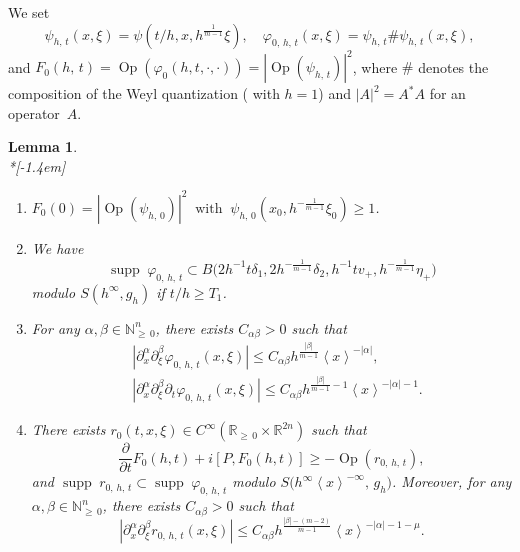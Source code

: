 \documentclass[10pt]{amsart}
\newtheorem{lemm}[cdrthm]{Lemma}
\theoremstyle{definition}
\renewcommand*\a{\alpha}
\renewcommand*\b{\beta}
\renewcommand*\d{\delta}
\newcommand*\f{\varphi}
\newcommand*\g{\psi}
\newcommand*\m{\mu}
\newcommand*\x{\xi}
\newcommand*\y{\eta}
\DeclareMathOperator{\Op}{Op}
\newcommand*\re{\mathbb{R}}
\newcommand{\bbN}{\mathbb{N}}
\newcommand*\pa{\partial}
\DeclareMathOperator{\supp}{supp\;}
\newcommand{\jap}[1]{\left\langle #1 \right\rangle}
\newcommand{\bigpare}[1]{\bigl(#1\bigr)}
\newcommand*{\romanenumi}{\renewcommand*{\theenumi}{\roman{enumi}}}
\begin{document}
We set
\begin{equation}\label{gdef}
\g_{h,\,t}(x,\x)= \g\left(t/h,x,h^{\frac{1}{m-1}}\x\right),\quad \f_{0,\,h,\,t}(x,\x)=\g_{h,\,t}\#\g_{h,\,t}(x,\x),
\end{equation}
and $F_0(h,\,t) =\Op(\f_0(h,t,\cdot, \cdot))=|\Op(\g_{h,\,t})|^2$, where $\#$ denotes the composition of the Weyl quantization (\cite[$(4.3.6)$]{Z} with $h=1$) and $|A|^2=A^*A$ for an operator~$A$.

\begin{lemm}\label{op}\ \\*[-1.4em]
\begin{enumerate}\romanenumi
\item \label{lemmB3.1}$F_0(0) =|\Op(\g_{h,\,0})|^2\;\; \text{with}\;\; \g_{h,\,0}(x_0,h^{-\frac{1}{m-1}}\x_0) \geq 1$.
\item \label{lemmB3.2}We have
\[
\supp \f_{0,\,h,\,t}\subset B\bigpare{2h^{-1}t\d_1,2h^{-\frac{1}{m-1}}\d_2,h^{-1}tv_+,h^{-\frac{1}{m-1}}\y_+}
\]
modulo $S(h^{\infty},g_h)$ if $t/h\geq T_1$.
\item \label{lemmB3.3}For any $\a,\b \in \bbN_{\geq\,0}^n$, there exists $C_{\a\b}>0$ such that
\begin{align*}
&\left|\pa_x^{\a}\pa_{\x}^{\b}\f_{0,\,h,\,t}(x,\x)\right|\leq C_{\a\b} h^{\frac{|\b|}{m-1}} \jap{x}^{-|\a|},\\
&\left|\pa_x^{\a}\pa_{\x}^{\b}\pa_t \f_{0,\,h,\,t}(x,\x)\right|\leq C_{\a\b} h^{\frac{|\b|}{m-1}-1} \jap{x}^{-|\a|-1}.
\end{align*}
\item \label{lemmB3.4}There exists $r_0(t,x,\x) \in C^{\infty} (\re_{\geq\,0} \times \re^{2n})$ such that
\[
\frac{\pa}{\pa t} F_0(h,t) + i[P, F_0(h,t)] \geq -\Op(r_{0,\,h,\,t}),
\]
and $\supp r_{0,\,h,\,t}\subset \supp \f_{0,\,h,\,t}$ modulo $S\bigpare{h^{\infty}\jap{x}^{-\infty},\,g_h}$. Moreover, for any $\a,\b \in \bbN_{\geq\,0}^n$, there exists $C_{\a\b}>0$ such that
\[
\left|\pa_x^{\a}\pa_{\x}^{\b}r_{0,\,h,\,t}(x,\x)\right|\leq C_{\a\b} h^{\frac{|\b|-(m-2)}{m-1}} \jap{x}^{-|\a|-1-\m}.
\]
\end{enumerate}

\end{lemm}
\end{document}
